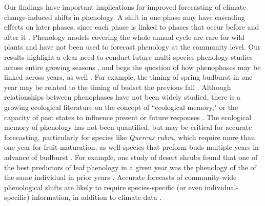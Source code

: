 \documentclass{article}
\begin{document}
\par Our findings have important implications for improved forecasting of climate change-induced shifts in phenology. A shift in one phase may have cascading effects on later phases, since each phase is linked to phases that occur before and after it \citep{wolkovich2014b}. Phenology models covering the whole annual cycle are rare for wild plants \citep[but see][]{chuine2001, li2016} and have not been used to forecast phenology at the community level. Our results highlight a clear need to conduct future multi-species phenology studies across entire growing seasons \citep{wolkovich2014}, and begs the question of how phenophases may be linked across years, as well \citep[e.g.,][]{elmendorf2016}. For example, the timing of spring budburst in one year may be related to the timing of budset the previous fall \citep {mimura2010}. Although relationships between phenophases have not been widely studied, there is a growing ecological literature on the concept of ``ecological memory," or the capacity of past states to influence present or future responses \citep {ogle2015}. The ecological memory of phenology has not been quantified, but may be critical for accurate forecasting, particularly for species like \emph{Quercus rubra}, which require more than one year for fruit maturation, as well species that preform buds multiple years in advance of budburst \citep{diggle1997,klimes2007}. For example, one study of desert shrubs found that one of the best predictors of leaf phenology in a given year was the phenology of the of the same individual in prior years \citep{cody2003}. Accurate forecasts of community-wide phenological shifts are likely to require species-specific (or even individual-specific) information, in addition to climate data \citep{diez2012}.
\end{document}
